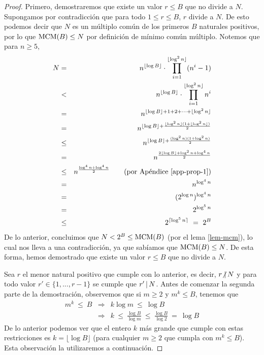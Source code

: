 \documentclass[10pt]{article}
\newcommand{\0}{\mathbf{0}}
\newcommand{\1}{\mathbf{1}}
\newcommand{\nodiv}{\text{$\not|$}\hspace{1.8pt}}
\newcommand{\divi}{\hspace{1.8pt}|\hspace{1.8pt}}
\newcommand{\MCM}{{\rm MCM}}
\newcommand{\+}{\oplus}
\theoremstyle{remark}
\theoremstyle{remark}
\begin{document}
\begin{proof}
Primero, demostraremos que existe un valor $r\leq B$ que no divide a $N$. Supongamos por contradicción que para todo $1\leq r\leq B$, $r$ divide a $N$. De esto podemos decir que $N$ es un múltiplo común de los primeros $B$ naturales positivos, por lo que $\MCM(B)\leq N$ por definición de mínimo común múltiplo. Notemos que para $n\geq 5$,
\begin{eqnarray*}
	N&=& n^{\lfloor \log B\rfloor}\cdot\prod_{i=1}^{ \lfloor\log ^2n\rfloor} (n^i-1)\\
	&<& n^{\lfloor \log B\rfloor}\cdot\prod_{i=1}^{\lfloor\log ^2n\rfloor} n^i\\
	&=& n^{\lfloor \log B\rfloor + 1+2+\cdots + \lfloor\log ^2n\rfloor}\\
	&=& n^{\lfloor \log B\rfloor + \frac{\lfloor\log ^2 n\rfloor(1+\lfloor\log ^2 n\rfloor)}{2}}\\
	&\leq & n^{\lfloor \log B\rfloor +\frac{(\log ^2 n)(1+\log ^2 n)}{2}}\\ 
	& = & n^{\frac{2\lfloor \log B\rfloor +\log ^2 n + \log ^4 n}{2}}\\
	&\leq & n^{\frac{\log^4 n + \log^4 n}{2}} \quad\quad\text{(por Apéndice \ref{app-prop-1})}\\
	&=& n^{\log^4 n}\\
	&=& (2^{\log n})^{\log^4 n}\\
	&=& 2^{\log^5 n}\\
	&\leq& 2^{\lceil\log^5 n\rceil } \ = \ 2^{B}
\end{eqnarray*}
De lo anterior, concluimos que $N<2^{B}\leq \MCM(B)$ (por el lema \ref{lem-mcm}), lo cual nos lleva a una contradicción, ya que sabíamos que $\MCM(B)\leq N$. De esta forma, hemos demostrado que existe un valor $r\leq B$ que no divide a $N$.

Sea $r$ el menor natural positivo que cumple con lo anterior, es decir, $r \nodiv N$ y para todo valor $r'\in\{1,...,r-1\}$ se cumple que $r'\divi N$.
 Antes de comenzar la segunda parte de la demostración, observemos que si $m\geq 2$ y $m^k\leq B$, tenemos que 
\begin{eqnarray*}
m^k \ \leq \ B &\Rightarrow& k\log m \ \leq \ \log B\\
	&\Rightarrow& k\ \leq \ \frac{\log B}{\log m}
	\ \leq \ \frac{\log B}{\log 2} \ = \ \log B
\end{eqnarray*}
De lo anterior podemos ver que el entero $k$ más grande que cumple con estas restricciones es $k = \lfloor \log B\rfloor$ (para cualquier $m\geq 2$ que cumpla con $m^k\leq B$). Esta observación la utilizaremos a continuación.


\end{proof}
\end{document}
